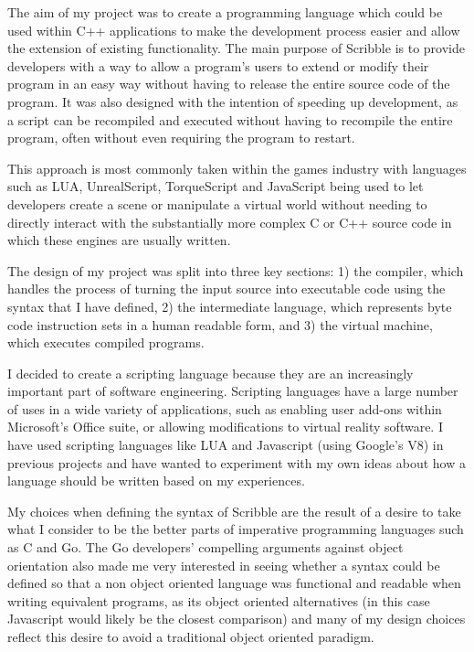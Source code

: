 \documentclass[]{final_report}
\begin{document}
The aim of my project was to create a programming language which could be used within C++ applications to make the development process easier and allow the extension of existing functionality. The main purpose of Scribble is to provide developers with a way to allow a program's users to extend or modify their program in an easy way without having to release the entire source code of the program. It was also designed with the intention of speeding up development, as a script can be recompiled and executed without having to recompile the entire program, often without even requiring the program to restart.

This approach is most commonly taken within the games industry with languages such as LUA, UnrealScript, TorqueScript and JavaScript being used to let developers create a scene or manipulate a virtual world without needing to directly interact with the substantially more complex C or C++ source code in which these engines are usually written.

The design of my project was split into three key sections: 1) the compiler, which handles the process of turning the input source into executable code using the syntax that I have defined, 2) the intermediate language, which represents byte code instruction sets in a human readable form, and 3) the virtual machine, which executes compiled programs.

I decided to create a scripting language because they are an increasingly important part of software engineering. Scripting languages have a large number of uses in a wide variety of applications, such as enabling user add-ons within Microsoft's Office suite, or allowing modifications to virtual reality software. I have used scripting languages like LUA and Javascript (using Google's V8) in previous projects and have wanted to experiment with my own ideas about how a language should be written based on my experiences. 

My choices when defining the syntax of Scribble are the result of a desire to take what I consider to be the better parts of imperative programming languages such as C and Go. The Go developers' compelling arguments against object orientation also made me very interested in seeing whether a syntax could be defined so that a non object oriented language was functional and readable when writing equivalent programs, as its object oriented alternatives (in this case Javascript would likely be the closest comparison) and many of my design choices reflect this desire to avoid a traditional object oriented paradigm.
\end{document}
